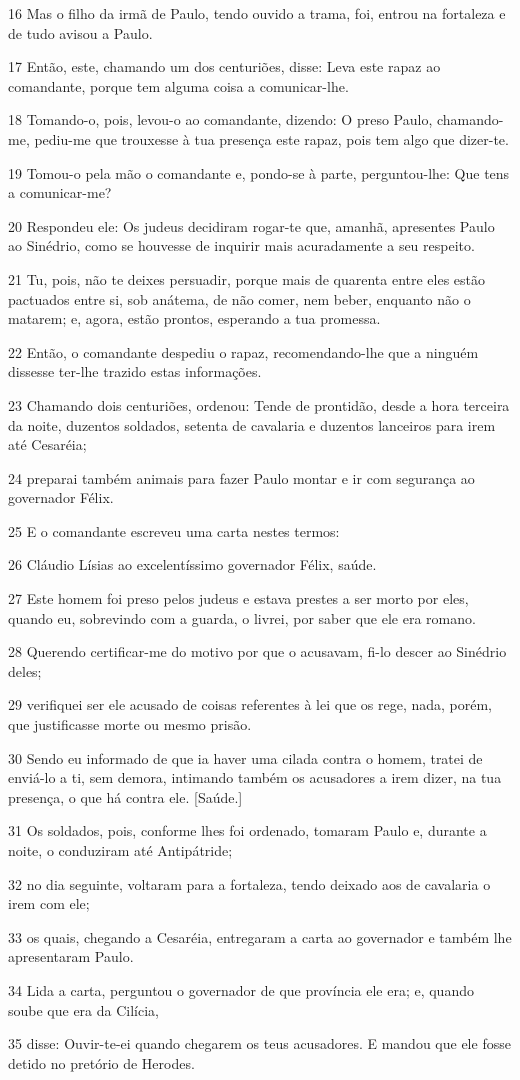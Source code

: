 \par 16 Mas o filho da irmã de Paulo, tendo ouvido a trama, foi, entrou na fortaleza e de tudo avisou a Paulo.
\par 17 Então, este, chamando um dos centuriões, disse: Leva este rapaz ao comandante, porque tem alguma coisa a comunicar-lhe.
\par 18 Tomando-o, pois, levou-o ao comandante, dizendo: O preso Paulo, chamando-me, pediu-me que trouxesse à tua presença este rapaz, pois tem algo que dizer-te.
\par 19 Tomou-o pela mão o comandante e, pondo-se à parte, perguntou-lhe: Que tens a comunicar-me?
\par 20 Respondeu ele: Os judeus decidiram rogar-te que, amanhã, apresentes Paulo ao Sinédrio, como se houvesse de inquirir mais acuradamente a seu respeito.
\par 21 Tu, pois, não te deixes persuadir, porque mais de quarenta entre eles estão pactuados entre si, sob anátema, de não comer, nem beber, enquanto não o matarem; e, agora, estão prontos, esperando a tua promessa.
\par 22 Então, o comandante despediu o rapaz, recomendando-lhe que a ninguém dissesse ter-lhe trazido estas informações.
\par 23 Chamando dois centuriões, ordenou: Tende de prontidão, desde a hora terceira da noite, duzentos soldados, setenta de cavalaria e duzentos lanceiros para irem até Cesaréia;
\par 24 preparai também animais para fazer Paulo montar e ir com segurança ao governador Félix.
\par 25 E o comandante escreveu uma carta nestes termos:
\par 26 Cláudio Lísias ao excelentíssimo governador Félix, saúde.
\par 27 Este homem foi preso pelos judeus e estava prestes a ser morto por eles, quando eu, sobrevindo com a guarda, o livrei, por saber que ele era romano.
\par 28 Querendo certificar-me do motivo por que o acusavam, fi-lo descer ao Sinédrio deles;
\par 29 verifiquei ser ele acusado de coisas referentes à lei que os rege, nada, porém, que justificasse morte ou mesmo prisão.
\par 30 Sendo eu informado de que ia haver uma cilada contra o homem, tratei de enviá-lo a ti, sem demora, intimando também os acusadores a irem dizer, na tua presença, o que há contra ele. [Saúde.]
\par 31 Os soldados, pois, conforme lhes foi ordenado, tomaram Paulo e, durante a noite, o conduziram até Antipátride;
\par 32 no dia seguinte, voltaram para a fortaleza, tendo deixado aos de cavalaria o irem com ele;
\par 33 os quais, chegando a Cesaréia, entregaram a carta ao governador e também lhe apresentaram Paulo.
\par 34 Lida a carta, perguntou o governador de que província ele era; e, quando soube que era da Cilícia,
\par 35 disse: Ouvir-te-ei quando chegarem os teus acusadores. E mandou que ele fosse detido no pretório de Herodes.

